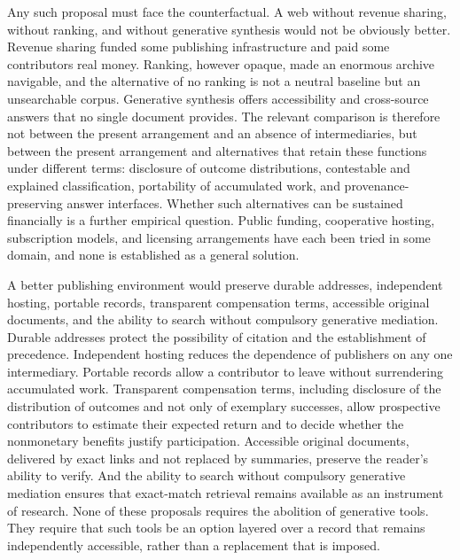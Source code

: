 \documentclass[11pt]{article}
\theoremstyle{remark}
\begin{document}
Any such proposal must face the counterfactual. A web without revenue sharing, without ranking, and without generative synthesis would not be obviously better. Revenue sharing funded some publishing infrastructure and paid some contributors real money. Ranking, however opaque, made an enormous archive navigable, and the alternative of no ranking is not a neutral baseline but an unsearchable corpus. Generative synthesis offers accessibility and cross-source answers that no single document provides. The relevant comparison is therefore not between the present arrangement and an absence of intermediaries, but between the present arrangement and alternatives that retain these functions under different terms: disclosure of outcome distributions, contestable and explained classification, portability of accumulated work, and provenance-preserving answer interfaces. Whether such alternatives can be sustained financially is a further empirical question. Public funding, cooperative hosting, subscription models, and licensing arrangements have each been tried in some domain, and none is established as a general solution.

A better publishing environment would preserve durable addresses, independent hosting, portable records, transparent compensation terms, accessible original documents, and the ability to search without compulsory generative mediation. Durable addresses protect the possibility of citation and the establishment of precedence. Independent hosting reduces the dependence of publishers on any one intermediary. Portable records allow a contributor to leave without surrendering accumulated work. Transparent compensation terms, including disclosure of the distribution of outcomes and not only of exemplary successes, allow prospective contributors to estimate their expected return and to decide whether the nonmonetary benefits justify participation. Accessible original documents, delivered by exact links and not replaced by summaries, preserve the reader's ability to verify. And the ability to search without compulsory generative mediation ensures that exact-match retrieval remains available as an instrument of research. None of these proposals requires the abolition of generative tools. They require that such tools be an option layered over a record that remains independently accessible, rather than a replacement that is imposed.
\end{document}
